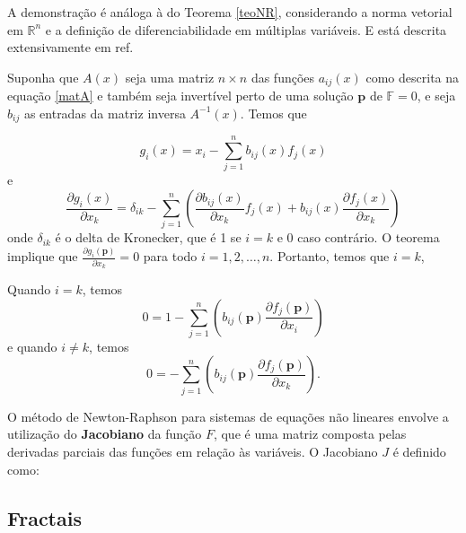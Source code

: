 A demonstração é análoga à do Teorema \ref{teoNR}, considerando a norma vetorial em \(\mathbb{R}^n\) e a definição de diferenciabilidade em múltiplas variáveis. E está descrita extensivamente em ref.


Suponha que \(A(x)\) seja uma matriz \(n \times n\) das funções \(a_{ij}(x)\) como descrita na equação \eqref{matA} e também seja invertível perto de uma solução \(\mathbf{p}\) de $\mathbb{F} = 0$, e seja \(b_{ij}\) as entradas da matriz inversa \(A^{-1}(x)\). Temos que 

\begin{equation}
    g_{i}(x) = x_i - \sum_{j=1}^{n} b_{ij}(x) f_j(x)
\end{equation}
e
\begin{equation}
    \frac{\partial g_i(x)}{\partial x_k} = \delta_{ik} - \sum_{j=1}^{n} \left( \frac{\partial b_{ij}(x)}{\partial x_k} f_j(x) + b_{ij}(x) \frac{\partial f_j(x)}{\partial x_k} \right)
\end{equation}
onde \(\delta_{ik}\) é o delta de Kronecker, que é 1 se \(i = k\) e 0 caso contrário.
O teorema implique que \( \frac{\partial g_i(\mathbf{p})}{\partial x_k} = 0 \) para todo $ i = 1,2, \ldots, n$. Portanto, temos que $ i = k $,

Quando \(i = k\), temos
\begin{equation}
    0 = 1 - \sum_{j=1}^{n} \left( b_{ij}(\mathbf{p}) \frac{\partial f_j(\mathbf{p})}{\partial x_i} \right)
\end{equation}
e quando \(i \neq k\), temos
\begin{equation}
    0 = - \sum_{j=1}^{n} \left( b_{ij}(\mathbf{p}) \frac{\partial f_j(\mathbf{p})}{\partial x_k} \right).
\end{equation}

O método de Newton-Raphson para sistemas de equações não lineares envolve a utilização do \textbf{Jacobiano} da função \(F\), que é uma matriz composta pelas derivadas parciais das funções em relação às variáveis. O Jacobiano \(J\) é definido como:

\subsection{Fractais}


